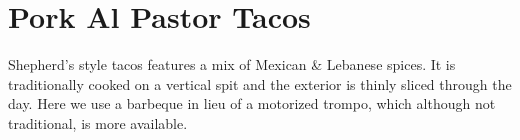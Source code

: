 \section[Pork Al Pastor]{Pork Al Pastor Tacos}


\begin{recipestats}[
	servings=8 people,
	preptime=2 \hour,
	bakingtime=8 \hour,
]
\end{recipestats}


\begin{recipeabstract}
	Shepherd's style tacos features a mix of Mexican \& Lebanese spices.
	It is traditionally cooked on a vertical spit and the exterior is thinly sliced through the day.
	Here we use a barbeque in lieu of a motorized trompo, which although not traditional, is more available.
\end{recipeabstract}

\begin{ingredientcolumns}[1]
	\begin{ingredientblock}
		\\
		\\
		\\
		\\
		\\
		\\
		\\
		\\
		\\
	\end{ingredientblock}
\end{ingredientcolumns}


